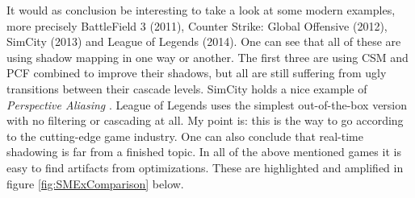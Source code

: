 It would as conclusion be interesting to take a look at some modern examples, more precisely BattleField 3 (2011), Counter Strike: Global Offensive (2012), SimCity (2013) and League of Legends (2014). One can see that all of these are using shadow mapping in one way or another. The first three are using CSM and PCF combined to improve their shadows, but all are still suffering from ugly transitions between their cascade levels. SimCity holds a nice example of \textit{Perspective Aliasing} \cite{ImprovedShadowMapping}. League of Legends uses the simplest out-of-the-box version with no filtering or cascading at all. My point is: this is the way to go according to the cutting-edge game industry. One can also conclude that real-time shadowing is far from a finished topic. In all of the above mentioned games it is easy to find artifacts from optimizations. These are highlighted and amplified in figure \ref{fig:SMExComparison} below.

